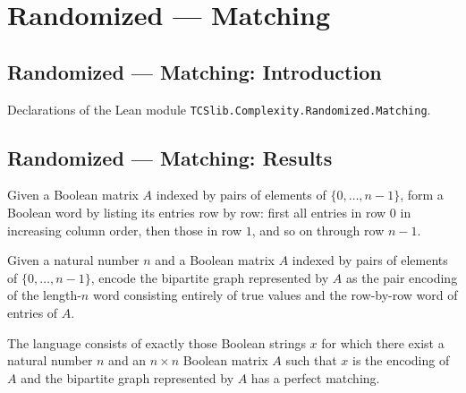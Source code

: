 \section{Randomized --- Matching}
\subsection*{Randomized --- Matching: Introduction}

Declarations of the Lean module \texttt{TCSlib.Complexity.Randomized.Matching}.

\subsection*{Randomized --- Matching: Results}

\begin{definition}
\label{Randomized.Matching.adjWord}
\leanok
Given a Boolean matrix $A$ indexed by pairs of elements of $\{0,\ldots,n-1\}$, form a
Boolean word by listing its entries row by row: first all entries in row $0$ in
increasing column order, then those in row $1$, and so on through row $n-1$.
\end{definition}

\begin{definition}
\label{Randomized.Matching.encodeBPM}
\leanok
{}
Given a natural number $n$ and a Boolean matrix $A$ indexed by pairs of elements of
$\{0,\ldots,n-1\}$, encode the bipartite graph represented by $A$ as the pair encoding
of the length-$n$ word consisting entirely of true values and the row-by-row word of
entries of $A$.
\end{definition}

\begin{definition}
\label{Randomized.Matching.BipartitePerfectMatching}
\leanok
{}
The language consists of exactly those Boolean strings $x$ for which there exist a
natural number $n$ and an $n\times n$ Boolean matrix $A$ such that $x$ is the encoding
of $A$ and the bipartite graph represented by $A$ has a perfect matching.
\end{definition}

